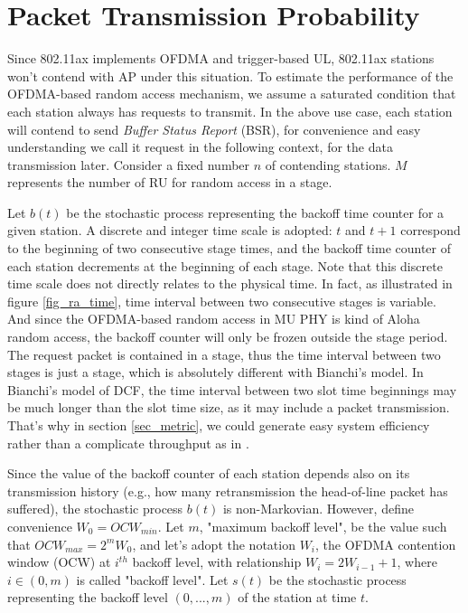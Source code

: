 \section{Packet Transmission Probability} \label{sec_model}
Since 802.11ax implements OFDMA and trigger-based UL, 802.11ax stations won't contend with AP under this situation.
To estimate the performance of the OFDMA-based random access mechanism, we assume a saturated condition that each station always has requests to transmit.
In the above use case, each station will contend to send \textit{Buffer Status Report} (BSR), for convenience and easy understanding we call it request in the following context, for the data transmission later. 
Consider a fixed number $n$ of contending stations. 
$M$ represents the number of RU for random access in a stage. 


Let $b(t)$ be the stochastic process representing the backoff time counter for a given station.
A discrete and integer time scale is adopted: $t$ and $t+1$ correspond to the beginning of two consecutive stage times, and the backoff time counter of each station decrements at the beginning of each stage.
Note that this discrete time scale does not directly relates to the physical time.
In fact, as illustrated in figure \ref{fig_ra_time}, time interval between two consecutive stages is variable.
And since the OFDMA-based random access in MU PHY is kind of Aloha random access, the backoff counter will only be frozen outside the stage period. 
The request packet is contained in a stage, thus the time interval between two stages is just a stage, which is absolutely different with Bianchi's model.
In Bianchi's model of DCF, the time interval between two slot time beginnings may be much longer than the slot time size, as it may include a packet transmission. 
That's why in section \ref{sec_metric}, we could generate easy system efficiency rather than a complicate throughput as in \cite{bianchi2000performance}.

Since the value of the backoff counter of each station depends also on its transmission history (e.g., how many retransmission the head-of-line packet has suffered), the stochastic process $b(t)$ is non-Markovian.
However, define convenience $W_0=OCW_{min}$. 
Let $m$, "maximum backoff level", be the value such that $OCW_{max}=2^mW_0$, and let's adopt the notation $W_i$, the OFDMA contention window (OCW) at $i^{th}$ backoff level, with relationship $W_i = 2W_{i-1}+1$, where $i\in (0,m)$ is called "backoff level".
Let $s(t)$ be the stochastic process representing the backoff level $(0,...,m)$ of the station at time $t$.

